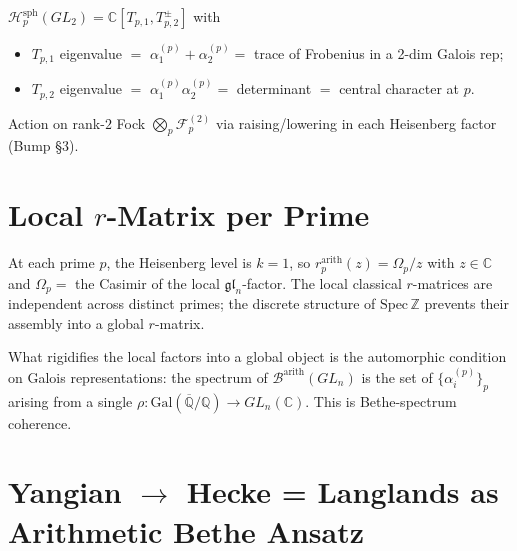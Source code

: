 \begin{proposition}
\label{v4-arith:prop:gl2-hecke-on-fock}
\(\mathcal{H}_{p}^{\mathrm{sph}}(GL_{2})=\mathbb{C}[T_{p,1},T_{p,2}^{\pm}]\)
with
\begin{itemize}
\item \(T_{p,1}\) eigenvalue \(=\) \(\alpha_{1}^{(p)}+\alpha_{2}^{(p)}=\) trace of Frobenius in a 2-dim Galois rep;
\item \(T_{p,2}\) eigenvalue \(=\) \(\alpha_{1}^{(p)}\alpha_{2}^{(p)}=\) determinant \(=\) central character at \(p\).
\end{itemize}
Action on rank-\(2\) Fock \(\bigotimes_{p}\mathcal{F}_{p}^{(2)}\) via
raising/lowering in each Heisenberg factor (Bump \S3).
\end{proposition}

\section{Local \(r\)-Matrix per Prime}
\label{v4-arith:dr:local-r-matrix}

\begin{proposition}
\label{v4-arith:prop:local-r-matrix}
At each prime \(p\), the Heisenberg level is
\(k=1\), so \(r^{\mathrm{arith}}_{p}(z)=\Omega_{p}/z\) with
\(z\in\mathbb{C}\) and \(\Omega_{p}=\) the Casimir of the local
\(\mathfrak{gl}_{n}\)-factor. The local classical \(r\)-matrices
are independent across distinct primes; the discrete structure of
\(\mathrm{Spec}\,\mathbb{Z}\) prevents their assembly into a global
\(r\)-matrix.
\end{proposition}

\begin{remark}
What rigidifies the local factors into a global object is the
automorphic condition on Galois representations: the spectrum
of \(\mathcal{B}^{\mathrm{arith}}(GL_{n})\) is the set of
\(\{\alpha_{i}^{(p)}\}_{p}\) arising from a single
\(\rho\colon\mathrm{Gal}(\overline{\mathbb{Q}}/\mathbb{Q})\to GL_{n}(\mathbb{C})\).
This is Bethe-spectrum coherence.
\end{remark}

\section{Yangian \(\to\) Hecke = Langlands as Arithmetic Bethe Ansatz}
\label{v4-arith:dr:yangian-hecke-langlands}

